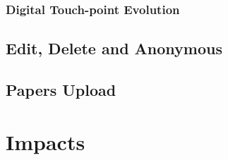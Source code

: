 \documentclass[a4paper]{article}
\begin{document}
    \subsubsection*{Digital Touch-point Evolution}
    \fi

    \subsection*{Edit, Delete and Anonymous}

    \subsection*{Papers Upload}

    \section*{Impacts}
\end{document}
